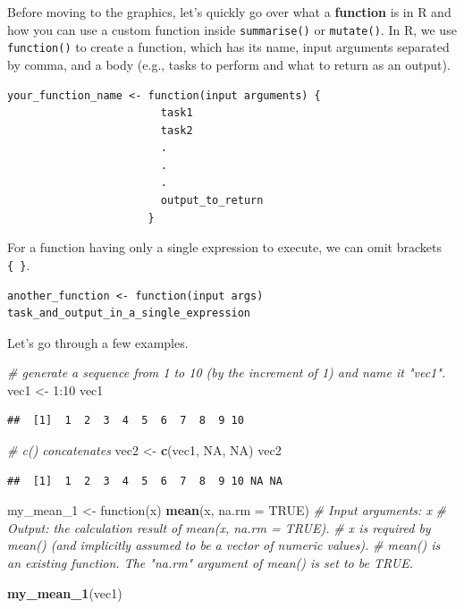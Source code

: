 \documentclass[]{book}
\newenvironment{Shaded}{\begin{snugshade}}{\end{snugshade}}
\newcommand{\KeywordTok}[1]{\textcolor[rgb]{0.13,0.29,0.53}{\textbf{{#1}}}}
\newcommand{\DataTypeTok}[1]{\textcolor[rgb]{0.13,0.29,0.53}{{#1}}}
\newcommand{\DecValTok}[1]{\textcolor[rgb]{0.00,0.00,0.81}{{#1}}}
\newcommand{\StringTok}[1]{\textcolor[rgb]{0.31,0.60,0.02}{{#1}}}
\newcommand{\CommentTok}[1]{\textcolor[rgb]{0.56,0.35,0.01}{\textit{{#1}}}}
\newcommand{\OtherTok}[1]{\textcolor[rgb]{0.56,0.35,0.01}{{#1}}}
\newcommand{\NormalTok}[1]{{#1}}
\theoremstyle{definition}
\theoremstyle{definition}
\theoremstyle{remark}
\begin{document}
Before moving to the graphics, let's quickly go over what a
\textbf{function} is in R and how you can use a custom function inside
\texttt{summarise()} or \texttt{mutate()}. In R, we use
\texttt{function()} to create a function, which has its name, input
arguments separated by comma, and a body (e.g., tasks to perform and
what to return as an output).

\begin{verbatim}
your_function_name <- function(input arguments) {
                        task1
                        task2
                        .
                        .
                        .
                        output_to_return 
                      } 
\end{verbatim}

For a function having only a single expression to execute, we can omit
brackets \texttt{\{\ \}}.

\begin{verbatim}
another_function <- function(input args) task_and_output_in_a_single_expression                    
\end{verbatim}

Let's go through a few examples.

\begin{Shaded}
\begin{Highlighting}[]
\CommentTok{# generate a sequence from 1 to 10 (by the increment of 1) and name it "vec1".  }
\NormalTok{vec1 <-}\StringTok{ }\DecValTok{1}\NormalTok{:}\DecValTok{10}
\NormalTok{vec1            }
\end{Highlighting}
\end{Shaded}

\begin{verbatim}
##  [1]  1  2  3  4  5  6  7  8  9 10
\end{verbatim}

\begin{Shaded}
\begin{Highlighting}[]
\CommentTok{# c() concatenates }
\NormalTok{vec2 <-}\StringTok{ }\KeywordTok{c}\NormalTok{(vec1, }\OtherTok{NA}\NormalTok{, }\OtherTok{NA}\NormalTok{)}
\NormalTok{vec2}
\end{Highlighting}
\end{Shaded}

\begin{verbatim}
##  [1]  1  2  3  4  5  6  7  8  9 10 NA NA
\end{verbatim}

\begin{Shaded}
\begin{Highlighting}[]
\NormalTok{my_mean_1 <-}\StringTok{ }\NormalTok{function(x)  }\KeywordTok{mean}\NormalTok{(x, }\DataTypeTok{na.rm =} \OtherTok{TRUE}\NormalTok{)}
  \CommentTok{# Input arguments: x }
  \CommentTok{# Output: the calculation result of mean(x, na.rm = TRUE). }
  \CommentTok{# x is required by mean() (and implicitly assumed to be a vector of numeric values). }
  \CommentTok{# mean() is an existing function. The "na.rm" argument of mean() is set to be TRUE.  }

\KeywordTok{my_mean_1}\NormalTok{(vec1)}
\end{Highlighting}
\end{Shaded}
\end{document}
